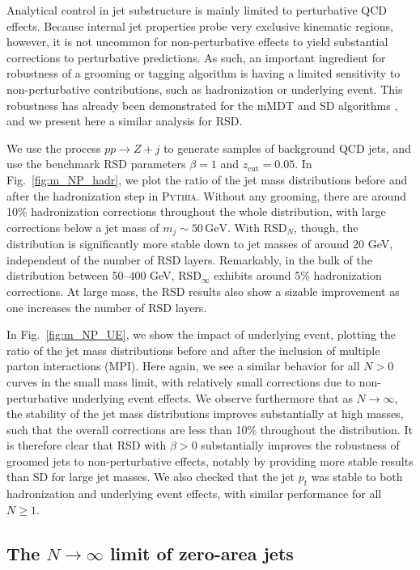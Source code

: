 \documentclass[11pt,a4paper]{article}
\newcommand{\zcut}{z_\text{cut}}
\newcommand{\GeV}{\,\mathrm{GeV}}
\newcommand{\pythia}[1]{\textsc{Pythia\xspace #1}}
\DeclareRobustCommand{\Fig}[1]{Fig.~\ref{#1}}
\begin{document}
Analytical control in jet substructure is mainly limited to perturbative QCD effects.
%
Because internal jet properties probe very exclusive
kinematic regions, however, it is not uncommon for non-perturbative effects to
yield substantial corrections to perturbative predictions.
%
As such, an important ingredient for robustness of a grooming
or tagging algorithm is having a limited sensitivity to non-perturbative
contributions, such as hadronization or underlying event.
%
This robustness has already been demonstrated for the mMDT and SD
algorithms \cite{Dasgupta:2013ihk,Larkoski:2014wba}, and we present
here a similar analysis for RSD.


We use the process $pp \to Z+ j$ to generate samples of background QCD
jets, and use the
benchmark RSD parameters $\beta=1$ and $\zcut = 0.05$.
%
In \Fig{fig:m_NP_hadr}, we plot the ratio of the jet mass distributions
before and after the hadronization step in \pythia.
%
Without any grooming, there are around 10\% hadronization corrections throughout the whole distribution, with large corrections below a jet mass of $m_j\sim 50 \GeV$.
%
With RSD$_N$, though, the distribution is significantly more stable
down to jet masses of around 20 GeV, independent of the number of RSD
layers.
%
Remarkably, in the bulk of the distribution between 50--400 GeV,  RSD$_\infty$ exhibits around 5\% hadronization corrections.
%
At large mass, the RSD results also show a sizable improvement
as one increases the number of RSD layers. 

In \Fig{fig:m_NP_UE}, we show the impact of underlying event,
plotting the ratio of the jet mass distributions before and after the
inclusion of multiple parton interactions (MPI).
%
Here again, we see a similar behavior for all $N>0$ curves in the
small mass limit, with relatively small corrections due to non-perturbative
underlying event effects.
%
We observe furthermore that as $N\rightarrow\infty$, the stability of
the jet mass distributions improves substantially at high masses, such that the overall corrections are less than 10\% throughout the distribution.
%
It is therefore clear that RSD with $\beta>0$ substantially improves
the robustness of groomed jets to non-perturbative effects, notably by
providing more stable results than SD for large jet masses.
%
We also checked that the jet $p_t$ was stable to both hadronization and underlying event effects, with similar performance for all $N \ge 1$.

\subsection{The $N\rightarrow\infty$ limit of zero-area jets}
\label{sec:zero-area}
\end{document}
